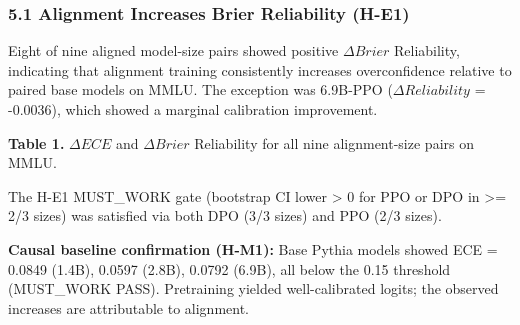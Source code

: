 
\subsubsection{5.1 Alignment Increases Brier Reliability (H-E1)}

Eight of nine aligned model-size pairs showed positive $\Delta Brier$ Reliability, indicating that alignment training consistently increases overconfidence relative to paired base models on MMLU. The exception was 6.9B-PPO ($\Delta Reliability$ = -0.0036), which showed a marginal calibration improvement.

\textbf{Table 1.} $\Delta ECE$ and $\Delta Brier$ Reliability for all nine alignment-size pairs on MMLU.

\begin{table}[htbp]
\centering
{}
\end{table}

The H-E1 MUST\_WORK gate (bootstrap CI lower > 0 for PPO or DPO in >= 2/3 sizes) was satisfied via both DPO (3/3 sizes) and PPO (2/3 sizes).

\textbf{Causal baseline confirmation (H-M1):} Base Pythia models showed ECE = 0.0849 (1.4B), 0.0597 (2.8B), 0.0792 (6.9B), all below the 0.15 threshold (MUST\_WORK PASS). Pretraining yielded well-calibrated logits; the observed increases are attributable to alignment.

